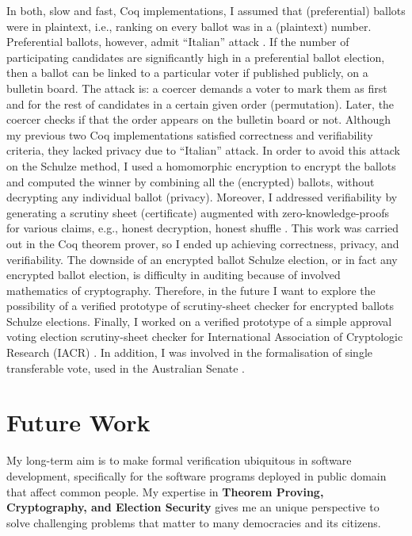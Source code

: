 \documentclass[a4paper]{article}
\begin{document}
In both, slow and fast, Coq implementations, I assumed that (preferential) ballots were in plaintext, i.e., 
ranking on every ballot was in a (plaintext) number.  Preferential ballots, 
however, admit ``Italian'' attack \cite{Otten, Benaloh:2009:SSC}. 
If the number of participating candidates are significantly high in 
a preferential ballot election,
then a ballot can be linked to a particular voter if published publicly, on a bulletin board.
The attack is: a coercer demands a voter to mark them as first and for the rest of candidates
in a certain given order (permutation). Later, the coercer checks if that the order appears 
on the bulletin board or not. Although my previous two Coq implementations \cite{10.1007/978-3-319-66107-0_26, bennett2017no} 
satisfied correctness and verifiability criteria, they lacked privacy due to ``Italian'' attack. 
In order to avoid this attack on the Schulze method, I used a homomorphic encryption 
to encrypt the ballots and computed the winner by combining all the 
(encrypted) ballots, without decrypting any individual ballot (privacy). 
Moreover, I addressed verifiability by generating a scrutiny sheet (certificate) 
augmented with zero-knowledge-proofs for various claims, e.g., honest decryption, honest shuffle \cite{10.1007/978-3-030-41600-3_4}. 
This work was carried out in the Coq theorem prover, so I ended up achieving
correctness, privacy, and verifiability. The downside of an encrypted ballot Schulze election, 
or in fact any encrypted ballot election, is difficulty in auditing because of involved 
mathematics of cryptography. Therefore, in the future I want to explore the possibility of a 
verified prototype of scrutiny-sheet checker for encrypted ballots Schulze elections.
Finally, I worked on a verified prototype of a simple approval voting election scrutiny-sheet checker for
International Association of Cryptologic Research (IACR) \cite{10.1145/3319535.3354247}. 
In addition, I was involved in the formalisation of single transferable vote, used in the Australian Senate
\cite{10.1007/978-3-030-00419-4_4}.


\section{Future Work}
My long-term aim is to make formal verification ubiquitous in 
software development, specifically for the software programs deployed in public domain
that affect common people.
My expertise in \textbf{Theorem Proving, Cryptography, and Election Security}
gives me an unique perspective to solve challenging problems that matter to many democracies 
and its citizens. 
\end{document}

